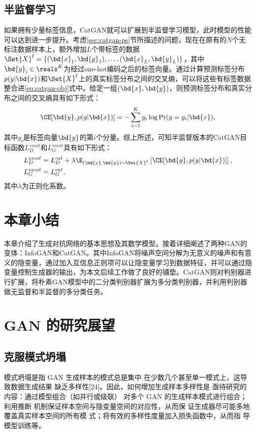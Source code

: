 \subsection{半监督学习}\label{sec:ss-catgan}
如果拥有少量标签信息，CatGAN就可以扩展到半监督学习模型，此时模型的性能可以达到进一步提升。考虑\ref{sec:catgan-ps}节所描述的问题，现在在原有的$N$个无标注数据样本上，额外增加$L$个带标签的数据$\Set{X}^{\ell} = \{(\bd{x}_1, \bd{y}_1), \ldots, (\bd{x}_L, \bd{y}_L)\}$，其中$\bd{y}_i \in \reals^K$为经过one-hot编码之后的标签向量。通过计算预测标签分布$p(y|\bd{x})$和$\Set{X}^{\ell}$上的真实标签分布之间的交叉熵，可以将这些有标签数据整合进\eqref{eq:catgan-obj}式中。给定一组$(\bd{x}, \bd{y})$，则预测标签分布和真实分布之间的交叉熵具有如下形式：
\begin{equation}
  \CE[\bd{y}, p(y|\bd{x})] = -\sum_{i=1}^K y_i \log\Pr(y=y_i|\bd{x}),
  \label{eq:cross-ent}
\end{equation}
其中$y_i$是标签向量$\bd{y}$的第$i$个分量。综上所述，可知半监督版本的CatGAN目标函数$L_D^{sscat}$和$L_G^{sscat}$具有如下形式：
\begin{equation}
  \begin{split}
    L_D^{sscat} &= L_D^{cat} + \lambda\E_{(\bd{x},\bd{y}) \sim \Set{X}^{\ell}}
    \left[ \CE[\bd{y}, p(y|\bd{x})] \right], \\
    L_G^{sscat} &= L_G^{cat}, 
  \end{split}
  \label{eq:ss-catgan-obj}
\end{equation}
其中$\lambda$为正则化系数。

\section{本章小结}
本章介绍了生成对抗网络的基本思想及其数学模型。接着详细阐述了两种GAN的变体：InfoGAN和CatGAN。其中InfoGAN将噪声空间分解为无意义的噪声和有意义的隐变量，通过加入互信息正则项可以让隐变量学习到数据特征，并可以通过隐变量控制生成器的输出，为本文后续工作做了良好的铺垫。CatGAN则对判别器进行扩展，将朴素GAN模型中的二分类判别器扩展为多分类判别器，并利用判别器做无监督和半监督的多分类任务。


\section{GAN 的研究展望}
\subsection{克服模式坍塌}
模式坍塌是指 GAN 生成样本的模式总是集中
在少数几个甚至单一模式上，这导致数据生成结果
缺乏多样性[24]。因此，如何增加生成样本多样性是
亟待研究的内容：通过模型组合（如并行或级联）
对多个 GAN 的生成样本模式进行组合；利用推断
机制保证样本空间与隐变量空间的对应性，从而保
证生成器尽可能多地覆盖真实样本空间的所有模
式；将有效的多样性度量加入损失函数中，从而指
导模型训练等。
